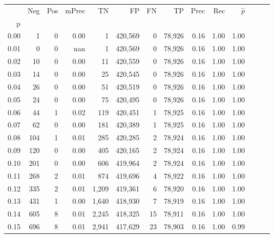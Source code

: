 \begin{tabular}{rrrrrrrrrrrrrr}
\toprule
{} &     Neg &    Pos & mPrec &       TN &       FP &      FN &      TP &  Prec &   Rec & $\hat{p}$ \\
p    &         &        &       &          &          &         &         &       &       &           \\
\midrule
0.00 &       1 &      0 &  0.00 &        1 &  420,569 &       0 &  78,926 &  0.16 &  1.00 &      1.00 \\
0.01 &       0 &      0 &   nan &        1 &  420,569 &       0 &  78,926 &  0.16 &  1.00 &      1.00 \\
0.02 &      10 &      0 &  0.00 &       11 &  420,559 &       0 &  78,926 &  0.16 &  1.00 &      1.00 \\
0.03 &      14 &      0 &  0.00 &       25 &  420,545 &       0 &  78,926 &  0.16 &  1.00 &      1.00 \\
0.04 &      26 &      0 &  0.00 &       51 &  420,519 &       0 &  78,926 &  0.16 &  1.00 &      1.00 \\
0.05 &      24 &      0 &  0.00 &       75 &  420,495 &       0 &  78,926 &  0.16 &  1.00 &      1.00 \\
0.06 &      44 &      1 &  0.02 &      119 &  420,451 &       1 &  78,925 &  0.16 &  1.00 &      1.00 \\
0.07 &      62 &      0 &  0.00 &      181 &  420,389 &       1 &  78,925 &  0.16 &  1.00 &      1.00 \\
0.08 &     104 &      1 &  0.01 &      285 &  420,285 &       2 &  78,924 &  0.16 &  1.00 &      1.00 \\
0.09 &     120 &      0 &  0.00 &      405 &  420,165 &       2 &  78,924 &  0.16 &  1.00 &      1.00 \\
0.10 &     201 &      0 &  0.00 &      606 &  419,964 &       2 &  78,924 &  0.16 &  1.00 &      1.00 \\
0.11 &     268 &      2 &  0.01 &      874 &  419,696 &       4 &  78,922 &  0.16 &  1.00 &      1.00 \\
0.12 &     335 &      2 &  0.01 &    1,209 &  419,361 &       6 &  78,920 &  0.16 &  1.00 &      1.00 \\
0.13 &     431 &      1 &  0.00 &    1,640 &  418,930 &       7 &  78,919 &  0.16 &  1.00 &      1.00 \\
0.14 &     605 &      8 &  0.01 &    2,245 &  418,325 &      15 &  78,911 &  0.16 &  1.00 &      1.00 \\
0.15 &     696 &      8 &  0.01 &    2,941 &  417,629 &      23 &  78,903 &  0.16 &  1.00 &      0.99 \\

\end{tabular}
